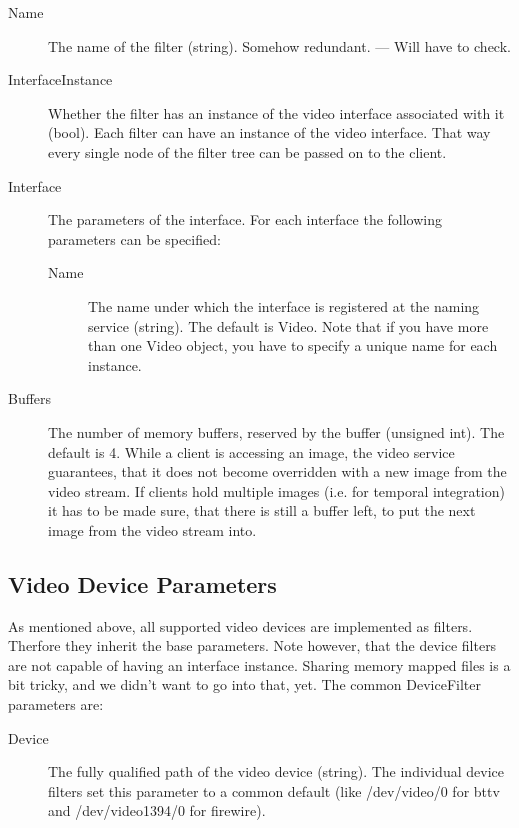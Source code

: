 \begin{description}
\item[Name] The name of the filter (string).
  Somehow redundant. --- Will have to check.
\item[InterfaceInstance] Whether the filter has an instance of the
  video interface associated with it (bool).
  Each filter can have an instance of the video interface. That way
  every single node of the filter tree can be passed on to the client.
\item[Interface] The parameters of the interface. For each interface
  the following parameters can be specified:
  \begin{description}
  \item[Name] The name under which the interface is registered at the
    naming service (string). The default is Video. Note that if
    you have more than one Video object, you have to specify a unique
    name for each instance.
  \end{description}
\item[Buffers] The number of memory buffers, reserved by the buffer
  (unsigned int). The default is 4. While a client is accessing an
  image, the video service guarantees, that it does not become
  overridden with a new image from the video stream. If clients hold
  multiple images (i.e. for temporal integration) it has to be made
  sure, that there is still a buffer left, to put the next image from
  the video stream into.
\end{description}

\subsection{Video Device Parameters}

As mentioned above, all supported video devices are implemented as
filters. Therfore they inherit the base parameters. Note however, that
the device filters are not capable of having an interface
instance. Sharing memory mapped files is a bit tricky, and we didn't
want to go into that, yet. The common DeviceFilter parameters are:

\begin{description}
\item[Device] The fully qualified path of the video device
  (string). The individual device filters set this parameter to
  a common default (like /dev/video/0 for bttv and /dev/video1394/0 for
  firewire).
\end{description}

